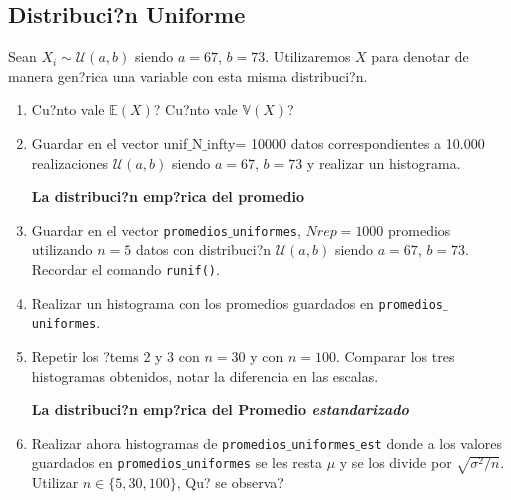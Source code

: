 \documentclass[12pt]{article}
\begin{document}
\subsection{Distribuci?n Uniforme}

Sean $X_i\sim \mathcal U(a, b)$ siendo $a=67$, $b=73$. Utilizaremos $X$ para denotar de manera gen?rica una variable con esta misma distribuci?n.  

\vspace{0.3cm}
\begin{enumerate}	
	\item \textquestiondown Cu?nto vale $\mathbb E(X)$?
	\textquestiondown Cu?nto vale $\mathbb{V}(X)$?
	\item Guardar en el vector unif$\_$N$\_$infty= 10000 datos correspondientes a 10.000 realizaciones $\mathcal U(a, b)$ siendo $a=67$, $b=73$ y  realizar un histograma. 
	
	
	\vspace{0.2cm}	
	\textbf{La distribuci?n emp?rica del promedio}
	
	\item Guardar en el  vector \texttt{promedios$\_$uniformes}, $Nrep=1000$ promedios utilizando $n=5$ datos con distribuci?n $\mathcal U(a, b)$ siendo $a=67$, $b=73$. Recordar  el comando \texttt{runif()}.
	
	
	\item Realizar un histograma con los promedios guardados en \texttt{promedios$\_$uniformes}.
	\item Repetir los ?tems 2 y 3 con $n=30$ y con $n=100$. Comparar los tres histogramas obtenidos, notar la diferencia en las escalas.
	
	\vspace{0.2cm}
	\textbf{La distribuci?n emp?rica  del Promedio \textit{estandarizado}}
	
	
		\item  Realizar ahora histogramas de \texttt{promedios$\_$uniformes$\_$est} donde a los valores guardados en \texttt{promedios$\_$uniformes} se les resta $\mu$ y se los divide por $\sqrt{\sigma^2/n}$. Utilizar  $n \in \{5,30,100\}$, \textquestiondown Qu? se observa?
	
	
\end{enumerate}
\end{document}
